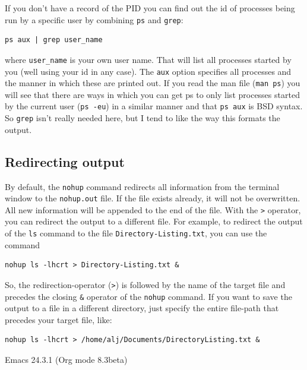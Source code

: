 \documentclass[11pt]{article}
\begin{document}
If you don't have a record of the PID you can find out the id of processes being run by a specific user
by combining \texttt{ps} and \texttt{grep}:

\begin{verbatim}
ps aux | grep user_name
\end{verbatim}

where \texttt{user\_name} is your own user name. That will list all processes started by
you (well using your id in any case). The \texttt{aux} option specifies all processes and
the manner in which these are printed out. If you read the man file (\texttt{man ps}) you
will see that there are ways in which you can get ps to only list processes started
by the current user (\texttt{ps -eu}) in a similar manner and that \texttt{ps aux} is BSD syntax.
So \texttt{grep} isn't really needed here, but I tend to like the way this formats the output.

\subsection{Redirecting output}
\label{sec-5-2}
By default, the \texttt{nohup} command redirects all information from the
terminal window to the \texttt{nohup.out} file. If the file exists already,
it will not be overwritten. All new information will be appended to
the end of the file. With the \texttt{>} operator, you can redirect the
output to a different file. For example, to redirect the output of the
\texttt{ls} command to the file \texttt{Directory-Listing.txt}, you can use the
command

\begin{verbatim}
nohup ls -lhcrt > Directory-Listing.txt &
\end{verbatim}

So, the redirection-operator (\texttt{>}) is followed by the name of the
target file and precedes the closing \texttt{\&} operator of the \texttt{nohup}
command. If you want to save the output to a file in a different
directory, just specify the entire file-path that precedes your target
file, like:

\begin{verbatim}
nohup ls -lhcrt > /home/alj/Documents/DirectoryListing.txt &
\end{verbatim}
Emacs 24.3.1 (Org mode 8.3beta)
\end{document}
